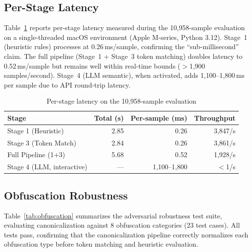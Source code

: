 \documentclass[manuscript,screen,review]{acmart}
\begin{document}
\subsection{Per-Stage Latency}
\label{sec:latency}

Table~\ref{tab:latency} reports per-stage latency measured during the 10{,}958-sample evaluation on a single-threaded macOS environment (Apple M-series, Python 3.12). Stage~1 (heuristic rules) processes at 0.26\,ms/sample, confirming the ``sub-millisecond'' claim. The full pipeline (Stage~1 + Stage~3 token matching) doubles latency to 0.52\,ms/sample but remains well within real-time bounds ($>$1{,}900 samples/second). Stage~4 (LLM semantic), when activated, adds 1{,}100--1{,}800\,ms per sample due to API round-trip latency.

\begin{table}[h]
\caption{Per-stage latency on the 10{,}958-sample evaluation}
\label{tab:latency}
\centering
\small
\begin{tabular}{lrrr}
\toprule
\textbf{Stage} & \textbf{Total (s)} & \textbf{Per-sample (ms)} & \textbf{Throughput} \\
\midrule
Stage 1 (Heuristic) & 2.85 & 0.26 & 3{,}847/s \\
Stage 3 (Token Match) & 2.84 & 0.26 & 3{,}861/s \\
Full Pipeline (1+3) & 5.68 & 0.52 & 1{,}928/s \\
Stage 4 (LLM, interactive) & --- & 1{,}100--1{,}800 & $<$1/s \\
\bottomrule
\end{tabular}
\end{table}

\subsection{Obfuscation Robustness}
\label{sec:obfuscation-robustness}

Table~\ref{tab:obfuscation} summarizes the adversarial robustness test suite, evaluating canonicalization against 8 obfuscation categories (23 test cases). All tests pass, confirming that the canonicalization pipeline correctly normalizes each obfuscation type before token matching and heuristic evaluation.
\end{document}
